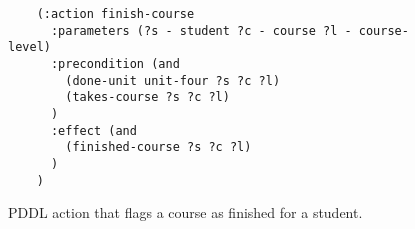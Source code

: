 \begin{figure}[t]
    \begin{lstlisting}
    (:action finish-course
      :parameters (?s - student ?c - course ?l - course-level)
      :precondition (and 
        (done-unit unit-four ?s ?c ?l)
        (takes-course ?s ?c ?l)
      )
      :effect (and
        (finished-course ?s ?c ?l)
      )
    )
    \end{lstlisting}
    \caption{PDDL action that flags a course as finished for a student.}\label{fig:finish-course}
\end{figure}